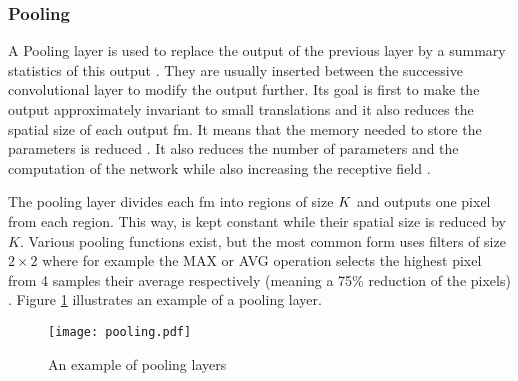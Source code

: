 \subsubsection{Pooling} \label{subs:pooling}
A Pooling layer is used to replace the output of the previous layer by a summary statistics of this output \cite{goodfellow_deep_2016}. They are usually inserted between the successive convolutional layer to modify the output further. Its goal is first to make the output approximately invariant to small translations and it also reduces the spatial size of each output \acrshort{fm}. It means that the memory needed to store the parameters is reduced \cite{goodfellow_deep_2016}. It also reduces the number of parameters and the computation of the network while also increasing the receptive field \cite{shawahna_fpga-based_2019}.

The pooling layer divides each \acrshort{fm} into regions of size $K \title K$ and outputs one pixel from each region. This way, is kept constant while their spatial size is reduced by $K$. Various pooling functions exist, but the most common form uses filters of size $2 \times 2$ where for example the MAX or AVG operation selects the highest pixel from 4 samples their average respectively (meaning a 75\% reduction of the pixels) \cite{suda_throughput-optimized_2016}. Figure \ref{fig:pool} illustrates an example of a pooling layer.
%
\begin{figure}
    \centering
    \texttt{[image: pooling.pdf]}
    \caption{An example of pooling layers}
    \label{fig:pool}
\end{figure}
